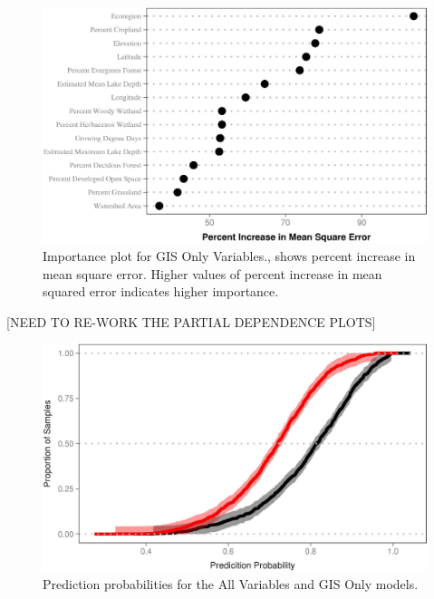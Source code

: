 \documentclass[11pt,]{article}
\begin{document}
\begin{figure}[htbp]
\centering
\includegraphics{manuscript_files/figure-latex/GIS_Importance-1.jpeg}
\caption{Importance plot for GIS Only Variables., shows percent increase
in mean square error. Higher values of percent increase in mean squared
error indicates higher importance. \label{fig:GIS_Importance}}
\end{figure}

\newpage

{[}NEED TO RE-WORK THE PARTIAL DEPENDENCE PLOTS{]}

\newpage

\begin{figure}[htbp]
\centering
\includegraphics{manuscript_files/figure-latex/unnamed-chunk-1-1.jpeg}
\caption{Prediction probabilities for the All Variables and GIS Only
models. \label{fig:prob_cdf}}
\end{figure}

\newpage
\end{document}
